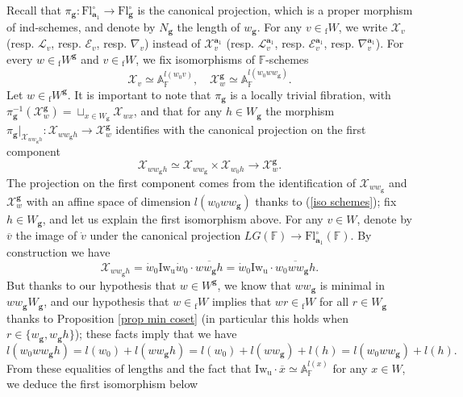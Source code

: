 \documentclass[11pt]{amsart}
\theoremstyle{plain}
\theoremstyle{remark}
\numberwithin{equation}{section}
\begin{document}
	Recall that $\pi_{\mathbf{g}}:\mathrm{Fl}^{\circ}_{\mathbf{a}_1}\to \mathrm{Fl}^{\circ}_{\mathbf{g}}$ is the canonical projection, which is a proper morphism of ind-schemes, and denote by $N_{\mathbf{g}}$ the length of $w_\mathbf{g}$. For any $v\in{_\mathrm{f}W}$, we write $\mathscr{X}_v$  (resp. $\mathcal{L}_v$, resp. $\mathcal{E}_v$, resp. $\nabla_v$) instead of $\mathscr{X}_v^{\mathbf{a}_1}$ (resp. $\mathcal{L}_v^{\mathbf{a}_1}$, resp. $\mathcal{E}^{\mathbf{a}_1}_v$, resp. $\nabla^{\mathbf{a}_1}_v$). For every $w\in {_\mathrm{f}W}^\mathbf{g}$ and $v\in {_\mathrm{f}W}$, we fix isomorphisms of $\mathbb{F}$-schemes
	\begin{equation}\label{iso schemes}
	    \mathscr{X}_{v}\simeq\mathbb{A}_\mathbb{F}^{l(w_0v)},\quad \mathscr{X}_{w}^\mathbf{g}\simeq \mathbb{A}_\mathbb{F}^{l(w_0ww_\mathbf{g})}.
	\end{equation}
	Let $w\in {_\mathrm{f}W}^\mathbf{g}$. It is important to note that $\pi_{\mathbf{g}}$ is a locally trivial fibration, with $\pi_\mathbf{g}^{-1}(\mathscr{X}_{w}^\mathbf{g})=\sqcup_{x\in W_\mathbf{g}}\mathscr{X}_{wx}$, and that for any $h\in W_\mathbf{g}$ the morphism $\pi_\mathbf{g}|_{\mathscr{X}_{ww_\mathbf{g}h}}:\mathscr{X}_{ww_\mathbf{g}h}\to \mathscr{X}_{w}^\mathbf{g}$ identifies with the canonical projection on the first component
	$$\mathscr{X}_{ww_\mathbf{g}h}\simeq\mathscr{X}_{ww_\mathbf{g}}\times \mathscr{X}_{w_0h}\to \mathscr{X}_{w}^\mathbf{g}.$$
	The projection on the first component comes from the identification of $\mathscr{X}_{ww_\mathbf{g}}$ and $\mathscr{X}_{w}^\mathbf{g}$ with an affine space of dimension $l(w_0ww_\mathbf{g})$ thanks to (\ref{iso schemes}); fix $h\in W_\mathbf{g}$, and let us explain the first isomorphism above. For any $v\in W$, denote by $\overline{v}$ the image of $\dot{v}$ under the canonical projection $LG(\mathbb{F})\to \mathrm{Fl}^{\circ}_{\mathbf{a}_1}(\mathbb{F})$. By construction we have 
	$$\mathscr{X}_{ww_\mathbf{g}h}=\dot{w}_0\mathrm{Iw}_{\mathrm{u}}\dot{w}_0\cdot\overline{ww_\mathbf{g}h}= \dot{w}_0\mathrm{Iw}_{\mathrm{u}}\cdot\overline{w_0ww_\mathbf{g}h}.$$ 
	But thanks to our hypothesis that $w\in W^\mathbf{g}$, we know that $ww_\mathbf{g}$ is minimal in $ww_\mathbf{g}W_\mathbf{g}$, and our hypothesis that $w\in {_\mathrm{f}W}$ implies that $wr\in {_\mathrm{f}W}$ for all $r\in W_\mathbf{g}$ thanks to Proposition \ref{prop min coset} (in particular this holds when $r\in\{w_\mathbf{g},w_\mathbf{g}h\}$); these facts imply that we have $$l(w_0ww_\mathbf{g}h)=l(w_0)+l(ww_\mathbf{g}h)=l(w_0)+l(ww_\mathbf{g})+l(h)=l(w_0ww_\mathbf{g})+l(h).$$ From these equalities of lengths and the fact that $\mathrm{Iw}_{\mathrm{u}}\cdot\overline{x}\simeq \mathbb{A}_\mathbb{F}^{l(x)}$ for any $x\in W$, we deduce the first isomorphism below
\end{document}
